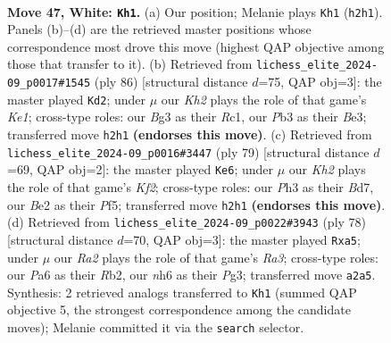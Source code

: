 \documentclass[11pt]{article}
\begin{document}
\clearpage

\begin{figure}[p]\centering
\begin{subfigure}{0.46\textwidth}\centering
\resizebox{\linewidth}{!}{%
\newchessgame
\chessboard[
  setfen={7r/p3b1kp/P6n/2r5/8/1Pp3BP/R1P1B1PK/1R6 w - - 1 47},
  showmover=false,
  pgfstyle=straightmove, color=movearrow, markmove={h2-h1}
]}
\caption{}
\end{subfigure}\hfill
\begin{subfigure}{0.46\textwidth}\centering
\resizebox{\linewidth}{!}{%
\newchessgame
\chessboard[
  setfen={8/1r4p1/p1b2pk1/P1P4p/7P/4B1P1/5P2/2R1K3 w - - 3 44},
  showmover=false,
  pgfstyle=straightmove, color=movearrow, markmove={e1-d2}
]}
\caption{}
\end{subfigure}
\\[4pt]
\begin{subfigure}{0.46\textwidth}\centering
\resizebox{\linewidth}{!}{%
\newchessgame
\chessboard[
  setfen={8/2Bb1kp1/2pP2p1/1p2rp2/1P1R4/7P/6PK/8 b - - 0 40},
  showmover=false,
  pgfstyle=straightmove, color=movearrow, markmove={f7-e6}
]}
\caption{}
\end{subfigure}\hfill
\begin{subfigure}{0.46\textwidth}\centering
\resizebox{\linewidth}{!}{%
\newchessgame
\chessboard[
  setfen={3r1k2/2r2ppp/3p4/p1n5/2P5/R5P1/1R3PBP/6K1 w - - 0 40},
  showmover=false,
  pgfstyle=straightmove, color=movearrow, markmove={a3-a5}
]}
\caption{}
\end{subfigure}
\caption{\textbf{Move 47, White: \texttt{Kh1}.} (a) Our position; Melanie plays \texttt{Kh1} (\texttt{h2h1}). Panels (b)--(d) are the retrieved master positions whose correspondence most drove this move (highest QAP objective among those that transfer to it). (b) Retrieved from \texttt{lichess\_elite\_2024-09\_p0017\#1545} (ply 86) [structural distance $d$=75, QAP obj=3]: the master played \texttt{Kd2}; under $\mu$ our \emph{Kh2} plays the role of that game's \emph{Ke1}; cross-type roles: our \emph{B}g3 as their \emph{R}c1, our \emph{P}b3 as their \emph{B}e3; transferred move \texttt{h2h1} \textbf{(endorses this move)}. (c) Retrieved from \texttt{lichess\_elite\_2024-09\_p0016\#3447} (ply 79) [structural distance $d$=69, QAP obj=2]: the master played \texttt{Ke6}; under $\mu$ our \emph{Kh2} plays the role of that game's \emph{Kf2}; cross-type roles: our \emph{P}h3 as their \emph{B}d7, our \emph{B}e2 as their \emph{P}f5; transferred move \texttt{h2h1} \textbf{(endorses this move)}. (d) Retrieved from \texttt{lichess\_elite\_2024-09\_p0022\#3943} (ply 78) [structural distance $d$=70, QAP obj=3]: the master played \texttt{Rxa5}; under $\mu$ our \emph{Ra2} plays the role of that game's \emph{Ra3}; cross-type roles: our \emph{P}a6 as their \emph{R}b2, our \emph{n}h6 as their \emph{P}g3; transferred move \texttt{a2a5}. Synthesis: 2 retrieved analogs transferred to \texttt{Kh1} (summed QAP objective 5, the strongest correspondence among the candidate moves); Melanie committed it via the \texttt{search} selector.}
\label{fig:thought-m92}
\end{figure}
\end{document}
